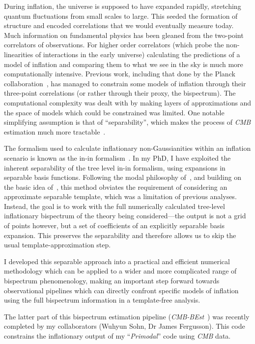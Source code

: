 During inflation, the universe is supposed to have expanded rapidly, stretching quantum fluctuations from small scales to large. This seeded the formation of structure and encoded correlations that we would eventually measure today.
Much information on fundamental physics has been gleaned from the two-point correlators of observations. For higher order correlators (which probe the non-linearities of interactions in the early universe) calculating the predictions of a model of inflation and comparing them to what we see in the sky is much more computationally intensive. Previous work, including that done by the Planck collaboration~\cite{Planck_NG_2018}, has managed to constrain some models of inflation through their three-point correlations (or rather through their proxy, the bispectrum).
The computational complexity was dealt with by making layers of approximations and the space
of models which could be constrained was limited.
One notable simplifying assumption is that of “separability”, which makes the process of \textit{CMB} estimation much more tractable~\cite{Komatsu_2005}.


The formalism used to calculate inflationary non-Gaussianities within an inflation scenario is
known as the in-in formalism~\cite{weinberg_in_in}.
In my PhD, I have exploited the inherent separability of the tree level in-in formalism,
using expansions in separable basis functions. Following the modal philosophy of~\cite{FergShell_3}, and building on the basic idea of~\cite{Funakoshi}, this method obviates the requirement of considering an approximate separable template,
which was a limitation of previous analyses. Instead,
the goal is to work with the full numerically calculated tree-level inflationary bispectrum of the theory
being considered---the output is not a grid of points however, but a set of coefficients of
an explicitly separable basis expansion.
This preserves the separability and therefore allows us to skip the usual template-approximation step.

I developed this separable approach into a practical and efficient numerical methodology which can be applied to a
wider and more complicated range of bispectrum phenomenology, making an important step forward towards observational
pipelines which can directly confront specific models of inflation using the full bispectrum information in a template-free analysis.

The latter part of this bispectrum estimation pipeline (\textit{CMB-BEst}~\cite{Sohn_2021}) was recently completed
by my collaborators (Wuhyun Sohn, Dr James Fergusson).
This code constrains the inflationary output of my ``\textit{Primodal}'' code using \textit{CMB} data.

